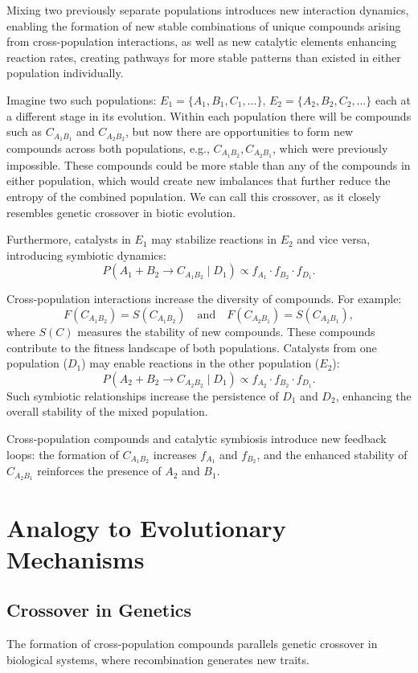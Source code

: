 \documentclass[entropy,article,submit,pdftex,moreauthors]{Definitions/mdpi}
\begin{document}
Mixing two previously separate populations introduces new interaction dynamics, enabling the formation of new stable combinations of unique compounds arising from cross-population interactions, as well as new catalytic elements enhancing reaction rates, creating pathways for more stable patterns than existed in either population individually.

Imagine two such populations: \( E_1 = \{A_1, B_1, C_1, \dots\} \), \( E_2 = \{A_2, B_2, C_2, \dots\} \) each at a different stage in its evolution. Within each population there will be compounds such as \( C_{A_1B_1} \) and \( C_{A_2B_2} \), but now there are opportunities to form new compounds across both populations, e.g., \( C_{A_1B_2}, C_{A_2B_1} \), which were previously impossible. These compounds could be more stable than any of the compounds in either population, which would create new imbalances that further reduce the entropy of the combined population. We can call this crossover, as it closely resembles genetic crossover in biotic evolution.

Furthermore, catalysts in \( E_1 \) may stabilize reactions in \( E_2 \) and vice versa, introducing symbiotic dynamics:
\[
P(A_1 + B_2 \to C_{A_1B_2} \mid D_1) \propto f_{A_1} \cdot f_{B_2} \cdot f_{D_1}.
\]

Cross-population interactions increase the diversity of compounds. For example:
\[
F(C_{A_1B_2}) = S(C_{A_1B_2}) \quad \text{and} \quad F(C_{A_2B_1}) = S(C_{A_2B_1}),
\]
where \( S(C) \) measures the stability of new compounds. These compounds contribute to the fitness landscape of both populations. Catalysts from one population (\( D_1 \)) may enable reactions in the other population (\( E_2 \)):
\[
P(A_2 + B_2 \to C_{A_2B_2} \mid D_1) \propto f_{A_2} \cdot f_{B_2} \cdot f_{D_1}.
\]
Such symbiotic relationships increase the persistence of \( D_1 \) and \( D_2 \), enhancing the overall stability of the mixed population.

Cross-population compounds and catalytic symbiosis introduce new feedback loops: the formation of \( C_{A_1B_2} \) increases \( f_{A_1} \) and \( f_{B_2} \), and the enhanced stability of \( C_{A_2B_1} \) reinforces the presence of \( A_2 \) and \( B_1 \).

\section{Analogy to Evolutionary Mechanisms}

\subsection*{Crossover in Genetics}
The formation of cross-population compounds parallels genetic crossover in biological systems, where recombination generates new traits.
\end{document}
